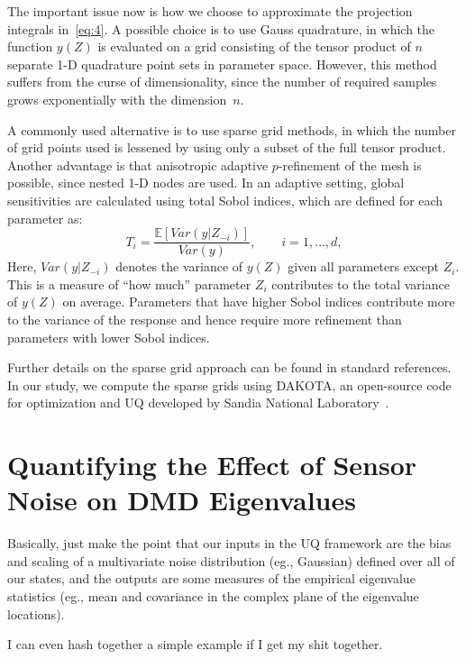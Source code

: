 \documentclass{aiaa-tc}%
\begin{document}
The important issue now is how we choose to approximate the projection
integrals in~\eqref{eq:4}. A possible choice is to use Gauss
quadrature, in which the function $y(Z)$ is evaluated on a grid
consisting of the tensor product of $n$ separate 1-D quadrature point
sets in parameter space. However, this method suffers from the
curse of dimensionality, since the number of required samples grows
exponentially with the dimension~$n$.

A commonly used alternative is to use sparse grid methods\cite{Smolyak}, in
which the number of grid points used is lessened by using only a subset of the
full tensor product.
%
Another advantage is that anisotropic
adaptive $p$-refinement of the mesh is possible, since nested 1-D
nodes are used. In an adaptive setting, global sensitivities are
calculated using total Sobol indices, which are defined for each
parameter as:
\begin{equation}
T_i = \frac{\mathbb{E} [ Var(y|Z_{-i}) ]}{Var(y)},\qquad i = 1,\ldots,d,
\label{eq:sobol}
\end{equation}
Here,
$Var(y|Z_{-i})$ denotes the variance of $y(Z)$ given all parameters
except $Z_i$. This is a measure of ``how much'' parameter $Z_i$
contributes to the total variance of $y(Z)$ on average. Parameters
that have higher Sobol indices contribute more to the variance of the
response and hence require more refinement than parameters with lower
Sobol indices.

Further details on the sparse grid approach can be found in standard
references\cite{lemaitre,Gerstner:SparseGrids}. In our study, we compute the
sparse grids using DAKOTA, an
open-source code for optimization and UQ developed by Sandia National
Laboratory~\cite{Dakota}.

\section{Quantifying the Effect of Sensor Noise on DMD Eigenvalues}

Basically, just make the point that our inputs in the UQ framework are
the bias and scaling of a multivariate noise distribution (eg.,
Gaussian) defined over all of our states, and the outputs are some
measures of the empirical eigenvalue statistics (eg., mean and
covariance in the complex plane of the eigenvalue locations).

I can even hash together a simple example if I get my shit together.



\end{document}
